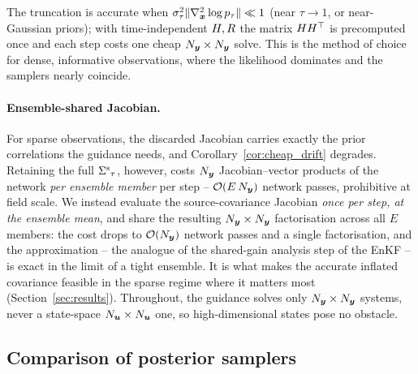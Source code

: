 The truncation is accurate when $\sigma_\tau^2\|\nabla_{\boldsymbol{x}}^2\log p_\tau\|\ll1$ (near $\tau\to1$, or near-Gaussian priors); with time-independent $H,R$ the matrix $HH^\top$ is precomputed once and each step costs one cheap $N_{\boldsymbol{y}}\times N_{\boldsymbol{y}}$ solve. This is the method of choice for dense, informative observations, where the likelihood dominates and the samplers nearly coincide.

\paragraph{Ensemble-shared Jacobian.}
For sparse observations, the discarded Jacobian carries exactly the prior correlations the guidance needs, and Corollary~\ref{cor:cheap_drift} degrades. Retaining the full ${\Sigma^{\mathrm{s}}}_\tau$, however, costs $N_{\boldsymbol{y}}$ Jacobian--vector products of the network \emph{per ensemble member} per step -- $\mathcal{O}(E\,N_{\boldsymbol{y}})$ network passes, prohibitive at field scale. We instead evaluate the source-covariance Jacobian \emph{once per step, at the ensemble mean}, and share the resulting $N_{\boldsymbol{y}}\times N_{\boldsymbol{y}}$ factorisation across all $E$ members: the cost drops to $\mathcal{O}(N_{\boldsymbol{y}})$ network passes and a single factorisation, and the approximation -- the analogue of the shared-gain analysis step of the EnKF -- is exact in the limit of a tight ensemble. It is what makes the accurate inflated covariance feasible in the sparse regime where it matters most (Section~\ref{sec:results}). Throughout, the guidance solves only $N_{\boldsymbol{y}}\times N_{\boldsymbol{y}}$ systems, never a state-space $N_{\boldsymbol{u}}\times N_{\boldsymbol{u}}$ one, so high-dimensional states pose no obstacle.

\subsection{Comparison of posterior samplers}
\label{subsec:summary_table}\label{subsec:supplying_diffusion}

